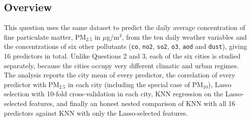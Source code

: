 \documentclass[conference]{IEEEtran}
\begin{document}
\subsection{Overview}
This question uses the same dataset to predict the daily average concentration of fine particulate matter, PM$_{2.5}$ in $\mu$g/m$^3$, from the ten daily weather variables and the concentrations of six other pollutants (\texttt{co}, \texttt{no2}, \texttt{so2}, \texttt{o3}, \texttt{aod} and \texttt{dust}), giving 16 predictors in total. Unlike Questions 2 and 3, each of the six cities is studied separately, because the cities occupy very different climatic and urban regimes. The analysis reports the city mean of every predictor, the correlation of every predictor with PM$_{2.5}$ in each city (including the special case of PM$_{10}$), Lasso selection with 10-fold cross-validation in each city, KNN regression on the Lasso-selected features, and finally an honest nested comparison of KNN with all 16 predictors against KNN with only the Lasso-selected features.
\end{document}

